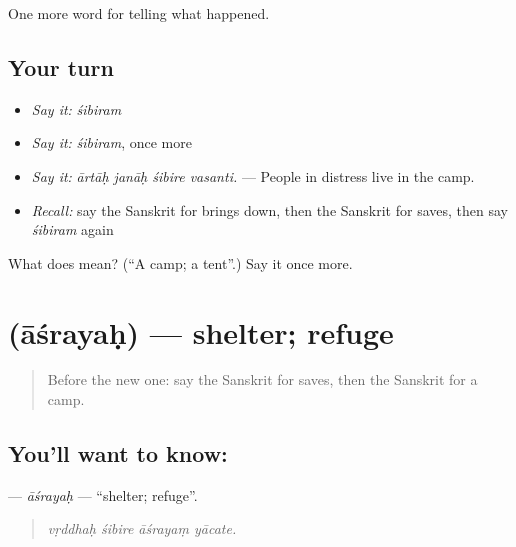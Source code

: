 \begin{grammarlens}[title={What you've built}]
One more word for telling what happened.
\end{grammarlens}

\subsection*{Your turn}
\begin{itemize}
\raggedright
  \item \emph{Say it:} \emph{śibiram}
  \item \emph{Say it:} \emph{śibiram}, once more
  \item \emph{Say it:} \emph{ārtāḥ janāḥ śibire vasanti.} — People in distress live in the camp.
  \item \emph{Recall:} say the Sanskrit for brings down, then the Sanskrit for saves, then say \emph{śibiram} again
\end{itemize}

\begin{tcolorbox}[breakable,colback=teal!4,colframe=teal!35!black,title={Before you move on}]
What does  mean? (\textquotedblleft{}A camp; a tent\textquotedblright{}.) Say it once more.
\end{tcolorbox}
\section[\texorpdfstring{\sk{आश्रयः} (āśrayaḥ)}{आश्रयः (āśrayaḥ)}]{ (āśrayaḥ) — shelter; refuge}

\label{lesson:SA-C306-asrayah}



\begin{quote}
Before the new one: say the Sanskrit for saves, then the Sanskrit for a camp.
\end{quote}

\subsection*{You'll want to know: }
\textbf{} — \emph{āśrayaḥ} — \textquotedblleft{}shelter; refuge\textquotedblright{}.

\begin{quote}
   
\end{quote}

\begin{quote}
\emph{vṛddhaḥ śibire āśrayaṃ yācate.}
\end{quote}

